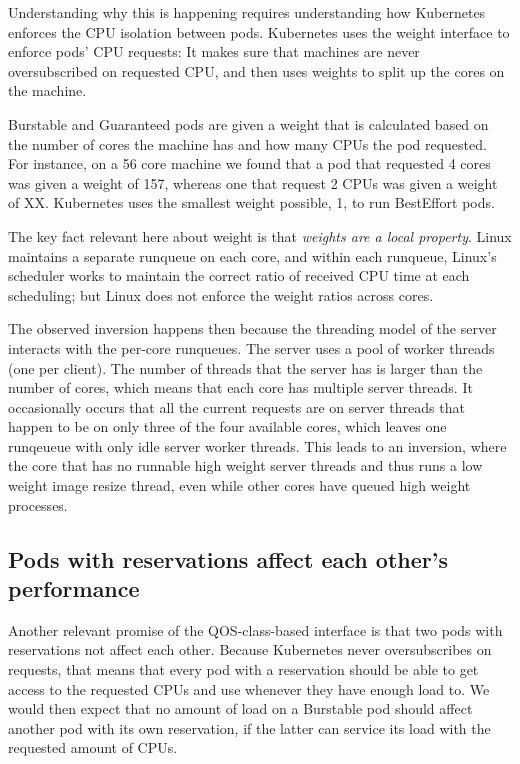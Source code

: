 Understanding why this is happening requires understanding how Kubernetes
enforces the CPU isolation between pods. Kubernetes uses the \cgroups{} weight
interface to enforce pods' CPU requests: It makes sure that machines are never
oversubscribed on requested CPU, and then uses weights to split up the cores on
the machine.

Burstable and Guaranteed pods are given a weight that is calculated based on the
number of cores the machine has and how many CPUs the pod requested. For
instance, on a 56 core machine we found that a pod that requested 4 cores was
given a weight of 157, whereas one that request 2 CPUs was given a weight of XX.
Kubernetes uses the smallest weight possible, 1, to run BestEffort pods.

The key fact relevant here about \cgroups{} weight is that \textit{weights are a
local property}. Linux maintains a separate runqueue on each core, and within
each runqueue, Linux's scheduler works to maintain the correct ratio of received
CPU time at each scheduling; but Linux does not enforce the weight ratios across
cores.

The observed inversion happens then because the threading model of the server
interacts with the per-core runqueues. The server uses a pool of worker threads
(one per client). The number of threads that the server has is larger than the
number of cores, which means that each core has multiple server threads. It
occasionally occurs that all the current requests are on server threads that
happen to be on only three of the four available cores, which leaves one
runqeueue with only idle server worker threads. This leads to an inversion,
where the core that has no runnable high weight server threads and thus runs a
low weight image resize thread, even while other cores have queued high weight
processes.


\subsection{Pods with reservations affect each other's performance}

Another relevant promise of the QOS-class-based interface is that two pods with
reservations not affect each other. Because Kubernetes never oversubscribes on
requests, that means that every pod with a reservation should be able to get
access to the requested CPUs and use whenever they have enough load to. We would
then expect that no amount of load on a Burstable pod should affect another pod
with its own reservation, if the latter can service its load with the requested
amount of CPUs.


